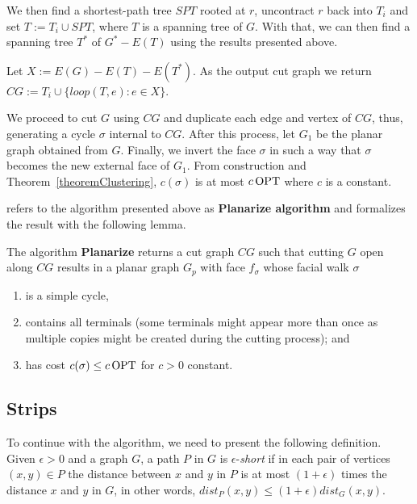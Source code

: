 We then find a shortest-path tree \(SPT\) rooted at \(r\), uncontract \(r\) back into \(T_i\) and set \(T := T_i \cup SPT\), where \(T\) is a spanning tree of \(G\). With that, we can then find a spanning tree \(T^\ast\) of \(G^\ast - E(T)\) using the results presented above.

Let \(X := E(G) - E(T) - E(T^\ast)\). As the output cut graph we return \(CG := T_i \cup \{loop(T, e): e \in X\}\).

We proceed to cut \(G\) using \(CG\) and duplicate each edge and vertex of \(CG\), thus, generating a cycle \(\sigma\) internal to \(CG\). After this process, let \(G_1\) be the planar graph obtained from \(G\). Finally, we invert the face \(\sigma\) in such a way that \(\sigma\) becomes the new external face of \(G_1\). From construction and Theorem~\ref{theoremClustering}, \(c(\sigma)\) is at most \(c \operatorname{\textrm{OPT}}\) where \(c\) is a constant.

\citeauthor{Borradaile2012} refers to the algorithm presented above as \textbf{Planarize algorithm} and formalizes the result with the following lemma.

\begin{flemma}
    The algorithm \textbf{Planarize} returns a cut graph \(CG\) such that cutting \(G\) open along \(CG\) results in a planar graph \(G_p\) with face \(f_\sigma\) whose facial walk \(\sigma\)

    \begin{enumerate}
        \item is a simple cycle,
        \item contains all terminals (some terminals might appear more than once as multiple copies might be created during the cutting process); and
        \item has cost \(c(\sigma) \leq c \operatorname{\textrm{OPT}}\) for \(c > 0\) constant.
    \end{enumerate}
\end{flemma}

\subsection{Strips}

To continue with the algorithm, we need to present the following definition. Given $\epsilon > 0$ and a graph \(G\), a path \(P\) in \(G\) is \(\epsilon\)-\textit{short} if in each pair of vertices \((x, y) \in P\) the distance between \(x\) and \(y\) in \(P\) is at most \((1 + \epsilon)\) times the distance \(x\) and \(y\) in \(G\), in other words, \(dist_P(x, y) \leq (1 + \epsilon) dist_G(x, y)\).

